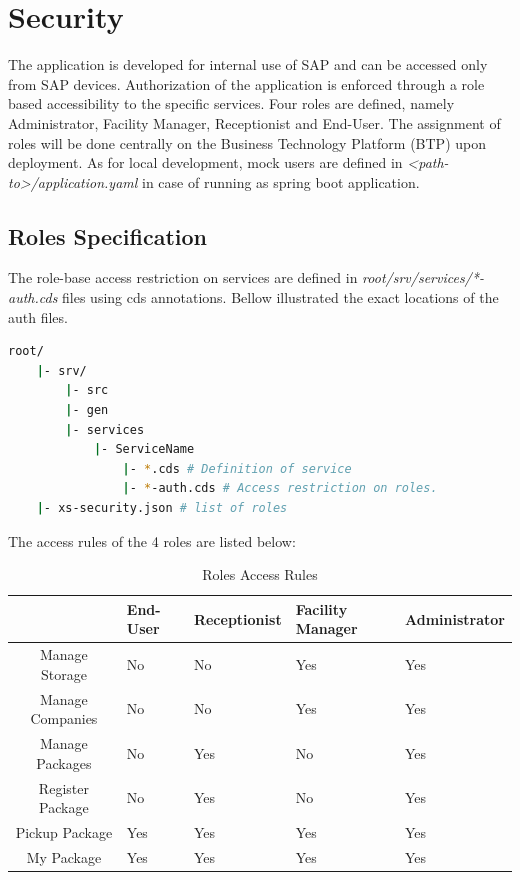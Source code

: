 \section{Security}
\label{sec:D-security}

The application is developed for internal use of SAP and can be accessed only from SAP devices. 
Authorization of the application is enforced through a role based accessibility to the specific services. Four roles are defined, namely Administrator, Facility Manager, Receptionist and End-User. The assignment of roles will be done centrally on the Business Technology Platform (BTP) upon deployment. As for local development, mock users are defined in \textit{<path-to>/application.yaml} in case of running as spring boot application.

\subsection{Roles Specification}
The role-base access restriction on services are defined in \textit{root/srv/services/*-auth.cds} files using cds annotations. Bellow illustrated the exact locations of the auth files.

\begin{lstlisting}[language={bash}]
root/
    |- srv/
        |- src
        |- gen
        |- services
            |- ServiceName 
                |- *.cds # Definition of service
                |- *-auth.cds # Access restriction on roles.
    |- xs-security.json # list of roles
\end{lstlisting}

The access rules of the 4 roles are listed below:

\begin{table}[H]
    \centering
    \begin{tabular}{|c|m{2.1cm}|m{2.1cm}|m{2.1cm}|m{2.5cm}|} \hline 
         & End-User & Receptionist & Facility Manager & Administrator     \\ \hline 
         Manage Storage          & No & No & Yes & Yes \\ \hline 
         Manage Companies         & No & No & Yes & Yes \\ \hline 
         Manage Packages          & No & Yes & No  & Yes \\ \hline 
         Register Package       & No & Yes & No  & Yes \\ \hline 
         Pickup Package           & Yes & Yes & Yes & Yes \\ \hline
         My Package               & Yes & Yes & Yes & Yes \\ \hline
    \end{tabular}
    \caption{Roles Access Rules}
    \label{tab:Access Rule}
\end{table}
